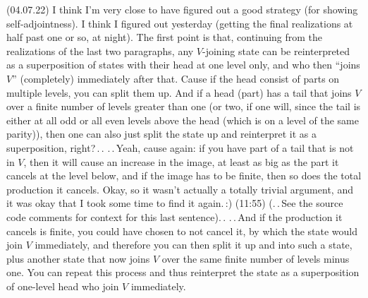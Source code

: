 \documentclass{report}
\begin{document}
(04.07.22) %
I think I'm very close to have figured out a good strategy (for showing self-adjointness). I think I figured out yesterday (getting the final realizations at half past one or so, at night). The first point is that, continuing from the realizations of the last two paragraphs, any $V$-joining state can be reinterpreted as a superposition of states with their head at one level only, and who then ``joins $V$'' (completely) immediately after that. Cause if the head consist of parts on multiple levels, you can split them up. And if a head (part) has a tail that joins $V$ over a finite number of levels greater than one (or two, if one will, since the tail is either at all odd or all even levels above the head (which is on a level of the same parity)), then one can also just split the state up and reinterpret it as a superposition, right?\,.\,. .\,.\,Yeah, cause again: if you have part of a tail that is not in $V$, then it will cause an increase in the image, at least as big as the part it cancels at the level below, and if the image has to be finite, then so does the total production it cancels. Okay, so it wasn't actually a totally trivial argument, and it was okay that I took some time to find it again.\,:) (11:55) (.\,.\,See the source code comments for context for this last sentence).\,. .\,.\,And if the production it cancels is finite, you could have chosen to not cancel it, by which the state would join $V$ immediately, and therefore you can then split it up and into such a state, plus another state that now joins $V$ over the same finite number of levels minus one. You can repeat this process and thus reinterpret the state as a superposition of one-level head who join $V$ immediately. 
\end{document}
